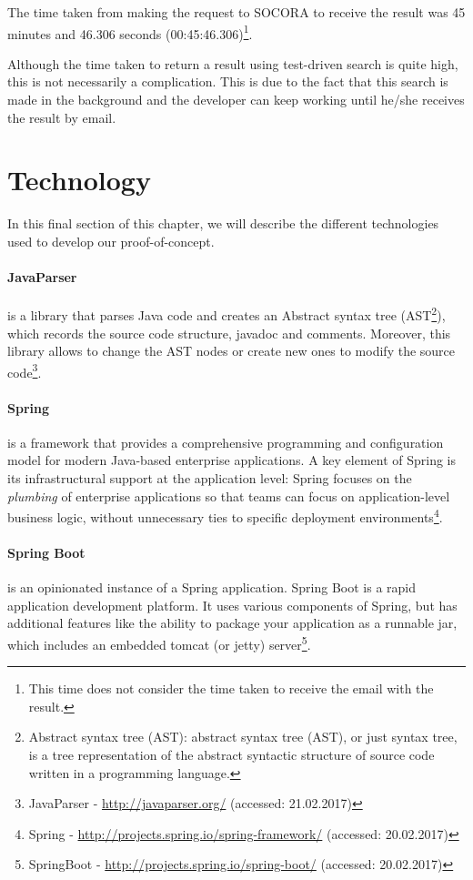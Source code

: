 {The time taken from making the request to SOCORA to receive the result was 45 minutes and 46.306 seconds (00:45:46.306)\footnote{This time does not consider the time taken to receive the email with the result.}.

Although the time taken to return a result using test-driven search is quite high, this is not necessarily a complication. This is due to the fact that this search is made in the background and the developer can keep working until he/she receives the result by email.

\section{Technology}
In this final section of this chapter, we will describe the different technologies used to develop our proof-of-concept.

\paragraph{JavaParser}
is a library that parses Java code and creates an Abstract syntax tree (AST\footnote{Abstract syntax tree (AST): abstract syntax tree (AST), or just syntax tree, is a tree representation of the abstract syntactic structure of source code written in a programming language.}), which records the source code structure, javadoc and comments. Moreover, this library allows to change the AST nodes or create new ones to modify the source code\footnote{JavaParser - \url{http://javaparser.org/} (accessed: 21.02.2017)}.
\paragraph{Spring}
is a framework that provides a comprehensive programming and configuration model for modern Java-based enterprise applications. A key element of Spring is its infrastructural support at the application level: Spring focuses on the \emph{plumbing} of enterprise applications so that teams can focus on application-level business logic, without unnecessary ties to specific deployment environments\footnote{Spring - \url{http://projects.spring.io/spring-framework/} (accessed: 20.02.2017)}.
\paragraph{Spring Boot}
is an opinionated instance of a Spring application. Spring Boot is a rapid application development platform. It uses various components of Spring, but has additional features like the ability to package your application as a runnable jar, which includes an embedded tomcat (or jetty) server\footnote{SpringBoot - \url{http://projects.spring.io/spring-boot/} (accessed: 20.02.2017)}.
}
